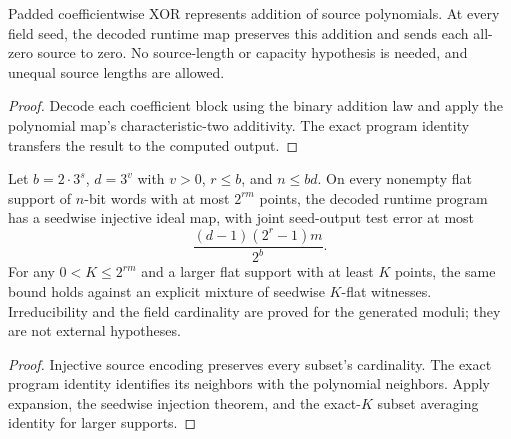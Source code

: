 \begin{theorem}
  \label{thm:lowerbounds-algebraic-encoded-condenser-linear}
  \leanok
  Padded coefficientwise XOR represents addition of source polynomials.
  At every field seed, the decoded runtime map preserves this addition
  and sends each all-zero source to zero. No source-length or capacity
  hypothesis is needed, and unequal source lengths are allowed.
\end{theorem}
\begin{proof}
  \leanok
  Decode each coefficient block using the binary addition law and apply
  the polynomial map's characteristic-two additivity. The exact program
  identity transfers the result to the computed output.
\end{proof}

\begin{theorem}
  \label{thm:lowerbounds-algebraic-encoded-condenser-lossless}
  \leanok
  Let $b=2\cdot3^s$, $d=3^v$ with $v>0$, $r\le b$, and $n\le bd$.
  On every nonempty flat support of $n$-bit words with at most $2^{rm}$
  points, the decoded runtime program has a seedwise injective ideal
  map, with joint seed-output test error at most
  \[
    \frac{(d-1)(2^r-1)m}{2^b}.
  \]
  For any $0<K\le2^{rm}$ and a larger flat support with at least $K$
  points, the same bound holds against an explicit mixture of seedwise
  $K$-flat witnesses. Irreducibility and the field cardinality are proved
  for the generated moduli; they are not external hypotheses.
\end{theorem}
\begin{proof}
  \leanok
  Injective source encoding preserves every subset's cardinality. The
  exact program identity identifies its neighbors with the polynomial
  neighbors. Apply expansion, the seedwise injection theorem, and the
  exact-$K$ subset averaging identity for larger supports.
\end{proof}

